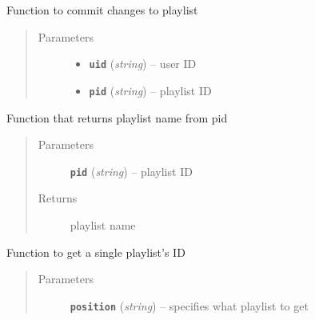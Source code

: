 \documentclass[letterpaper,10pt,english]{sphinxmanual}
\begin{document}
\begin{fulllineitems}

\begin{fulllineitems}
\label{code:gitsound.SpotifyUser.commit_changes_to_playlist}
Function to commit changes to playlist
\begin{quote}\begin{description}
\item[{Parameters}] \leavevmode\begin{itemize}
\item {} 
\textbf{\texttt{uid}} (\emph{string}) -- user ID

\item {} 
\textbf{\texttt{pid}} (\emph{string}) -- playlist ID

\end{itemize}

\end{description}\end{quote}

\end{fulllineitems}


\begin{fulllineitems}
\label{code:gitsound.SpotifyUser.get_playlist_from_id}
Function that returns playlist name from pid
\begin{quote}\begin{description}
\item[{Parameters}] \leavevmode
\textbf{\texttt{pid}} (\emph{string}) -- playlist ID

\item[{Returns}] \leavevmode
playlist name

\end{description}\end{quote}

\end{fulllineitems}


\begin{fulllineitems}
\label{code:gitsound.SpotifyUser.get_playlist_id}
Function to get a single playlist's ID
\begin{quote}\begin{description}
\item[{Parameters}] \leavevmode
\textbf{\texttt{position}} (\emph{string}) -- specifies what playlist to get


\end{description}
\end{quote}
\end{fulllineitems}
\end{fulllineitems}
\end{document}
